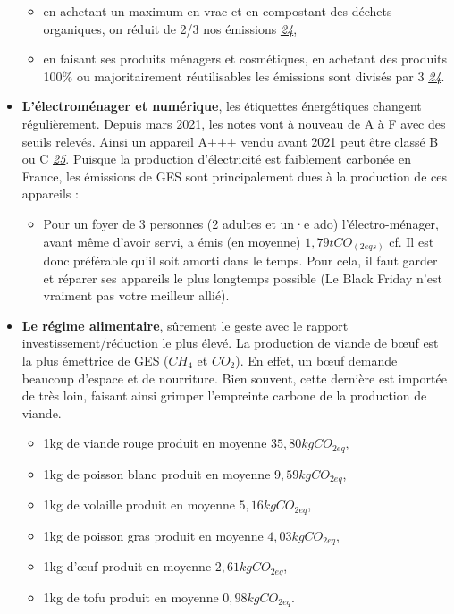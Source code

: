 \begin{itemize}
  \begin{itemize}
  \tightlist
  \item
    en achetant un maximum en vrac et en compostant des déchets
    organiques, on réduit de 2/3 nos émissions
    \emph{\href{https://nosgestesclimat.fr/documentation}{24}},
  \item
    en faisant ses produits ménagers et cosmétiques, en achetant des
    produits 100\% ou majoritairement réutilisables les émissions sont
    divisés par 3
    \emph{\href{https://nosgestesclimat.fr/documentation}{24}}.
  \end{itemize}
\item
  \textbf{L'électroménager et numérique}, les étiquettes énergétiques
  changent régulièrement. Depuis mars 2021, les notes vont à nouveau de
  A à F avec des seuils relevés. Ainsi un appareil A+++ vendu avant 2021
  peut être classé B ou C
  \emph{\href{https://fr.label2020.eu/la-nouvelle-etiquette-energie/caracteristiques-principales-des-nouvelles-etiquettes-energie/}{25}}.
  Puisque la production d'électricité est faiblement carbonée en France,
  les émissions de GES sont principalement dues à la production de ces
  appareils :

  \begin{itemize}
  \tightlist
  \item
    Pour un foyer de 3 personnes (2 adultes et un·e ado)
    l'électro-ménager, avant même d'avoir servi, a émis (en moyenne)
    \(1,79 tCO_(2eqs)\)
    \protect\hyperlink{Tableau-impact-fabriction}{cf}. Il est donc
    préférable qu'il soit amorti dans le temps. Pour cela, il faut
    garder et réparer ses appareils le plus longtemps possible (Le Black
    Friday n'est vraiment pas votre meilleur allié).
  \end{itemize}
\item
  \textbf{Le régime alimentaire}, sûrement le geste avec le rapport
  investissement/réduction le plus élevé. La production de viande de
  bœuf est la plus émettrice de GES (\(CH_{4}\) et \(CO_{2}\)). En
  effet, un bœuf demande beaucoup d'espace et de nourriture. Bien
  souvent, cette dernière est importée de très loin, faisant ainsi
  grimper l'empreinte carbone de la production de viande.

  \begin{itemize}
  \tightlist
  \item
    1kg de viande rouge produit en moyenne \(35,80 kgCO_{2eq}\),
  \item
    1kg de poisson blanc produit en moyenne \(9,59 kgCO_{2eq}\),
  \item
    1kg de volaille produit en moyenne \(5,16 kgCO_{2eq}\),\\
  \item
    1kg de poisson gras produit en moyenne \(4,03 kgCO_{2eq}\),
  \item
    1kg d'œuf produit en moyenne \(2,61 kgCO_{2eq}\),
  \item
    1kg de tofu produit en moyenne \(0,98 kgCO_{2eq}\).
  \end{itemize}
\end{itemize}


